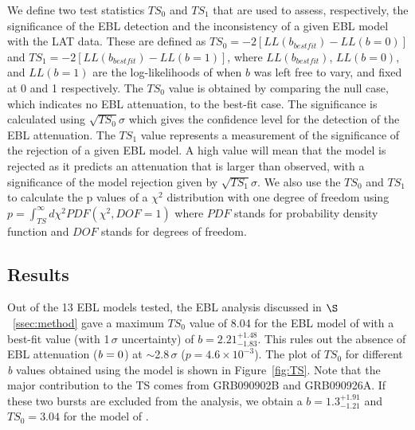 \documentclass[12pt,preprint]{aastex}
\begin{document}
We define two test statistics $TS_0$ and $TS_1$ that are used to
assess, respectively, the significance of the EBL detection and the
inconsistency of a given EBL model with the LAT data. These are
defined as $TS_0=-2 [LL(b_{best fit}) - LL(b=0)] $ and $TS_1=-2
[LL(b_{best fit}) - LL(b=1)]$, where $LL(b_{best fit})$, $LL(b=0)$, and
$LL(b=1)$
are the log-likelihoods of when $b$ was left free to vary, and fixed at
0 and 1 respectively.
The $TS_0$ value is obtained by comparing the null case, which indicates no EBL attenuation,
to the best-fit case. {The significance is calculated using $\sqrt{TS_{0}}\sigma$ which} gives 
the confidence level for the detection of the EBL attenuation.
{ The $TS_1$ value represents a measurement of the significance of the rejection of a given EBL model.} A high value will mean that the model
is rejected as it predicts an attenuation that is larger than observed,
with a significance of the model rejection given by $\sqrt{TS_{1}}\sigma$.
 {We also use the $TS_0$ and $TS_1$ to calculate the p values of a $\chi ^2$ distribution with one degree of
freedom using $p  = \int_{TS}^{\infty} d\chi^2 PDF(\chi^2, DOF = 1) $ where $PDF$ stands for probability density function and $DOF$ stands for degrees of freedom.}


\subsection{Results}
\label{ssec:eblresults}

Out of the 13 EBL models tested, the EBL analysis discussed in $\S$~\ref{ssec:method} gave a maximum $TS_0$ value of 8.04 for the EBL model
of \cite{dominguez11} with a best-fit value (with 1\,$\sigma$ uncertainty) of 
$b=2.21_{-1.83}^{+1.48}$.
This rules out the absence of EBL attenuation (${\it b}=0$) at $\sim$2.8\,$\sigma$ {($p= 4.6 \times 10^{-3}$)}.
The plot of $TS_0$ for different {\it b} values obtained using the \cite{dominguez11} model is shown in Figure~\ref{fig:TS}. { Note that the major contribution to the TS comes from GRB090902B and GRB090926A. If these two bursts are excluded from the analysis, we obtain a $b=1.3_{-1.21}^{+1.91}$ and $TS_0=3.04$ for the model of \cite{dominguez11}.}  
\end{document}
